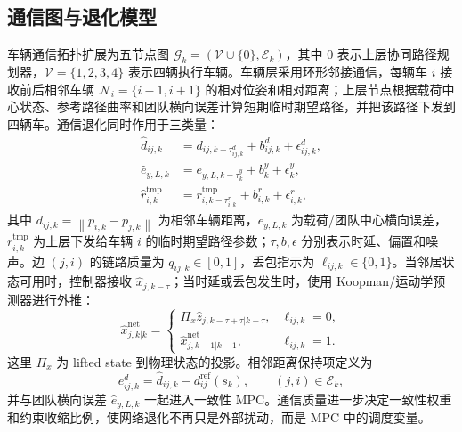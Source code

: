 \documentclass[twocolumn,3p,times,procedia]{elsarticle}
\newif\ifNRReview
\newcommand{\reviewblock}[1]{\ifNRReview\par\smallskip\noindent\begingroup\setlength{\fboxsep}{4pt}\colorbox{yellow!35}{\parbox{0.96\linewidth}{\footnotesize\textbf{当前不足：} #1}}\endgroup\par\smallskip\fi}
\newcommand{\norm}[1]{\left\lVert #1 \right\rVert}
\begin{document}
\subsection{通信图与退化模型}

车辆通信拓扑扩展为五节点图 $\mathcal G_k=(\mathcal V\cup\{0\},\mathcal E_k)$，其中 $0$ 表示上层协同路径规划器，$\mathcal V=\{1,2,3,4\}$ 表示四辆执行车辆。车辆层采用环形邻接通信，每辆车 $i$ 接收前后相邻车辆 $\mathcal N_i=\{i-1,i+1\}$ 的相对位姿和相对距离；上层节点根据载荷中心状态、参考路径曲率和团队横向误差计算短期临时期望路径，并把该路径下发到四辆车。通信退化同时作用于三类量：
\begin{equation}
\begin{aligned}
\hat d_{ij,k}&=d_{ij,k-\tau^d_{ij,k}}+b^d_{ij,k}+\epsilon^d_{ij,k},\\
\hat e_{y,L,k}&=e_{y,L,k-\tau^y_k}+b^y_k+\epsilon^y_k,\\
\hat r_{i,k}^{\mathrm{tmp}}&=r_{i,k-\tau^r_{i,k}}^{\mathrm{tmp}}+b^r_{i,k}+\epsilon^r_{i,k},
\end{aligned}
\label{eq:comm_corrupted_measurements}
\end{equation}
其中 $d_{ij,k}=\norm{p_{i,k}-p_{j,k}}$ 为相邻车辆距离，$e_{y,L,k}$ 为载荷/团队中心横向误差，$r_{i,k}^{\mathrm{tmp}}$ 为上层下发给车辆 $i$ 的临时期望路径参数；$\tau,b,\epsilon$ 分别表示时延、偏置和噪声。边 $(j,i)$ 的链路质量为 $q_{ij,k}\in[0,1]$，丢包指示为 $\ell_{ij,k}\in\{0,1\}$。当邻居状态可用时，控制器接收 $\hat x_{j,k-\tau}$；当时延或丢包发生时，使用 Koopman/运动学预测器进行外推：
\begin{equation}
\hat x_{j,k|k}^{\mathrm{net}}=
\begin{cases}
\Pi_x \hat z_{j,k-\tau+\tau|k-\tau}, & \ell_{ij,k}=0,\\
\hat x_{j,k-1|k-1}^{\mathrm{net}}, & \ell_{ij,k}=1 .
\end{cases}
\label{eq:delay_prediction}
\end{equation}
这里 $\Pi_x$ 为 lifted state 到物理状态的投影。相邻距离保持项定义为
\begin{equation}
e^{d}_{ij,k}=\hat d_{ij,k}-d^{\mathrm{ref}}_{ij}(s_k),\qquad (j,i)\in\mathcal E_k ,
\label{eq:adjacent_distance_error}
\end{equation}
并与团队横向误差 $\hat e_{y,L,k}$ 一起进入一致性 MPC。通信质量进一步决定一致性权重和约束收缩比例，使网络退化不再只是外部扰动，而是 MPC 中的调度变量。
\reviewblock{实验3已启用相邻距离保持诊断、团队横向误差通信退化、上层--下层路径链路以及四轮转向局部路径预瞄；最新同初始条件面板可把 5 m/s 回头弯写作“高曲率抗扰分支显著降低横向 RMSE 和峰值、货物保护分支降低合力并保持误差可接受”，把 15 m/s 正弦写作速度裁剪修正后完整路段闭合，并在 single-seed 下同时降低横向与纵向 RMSE。2/10/15 m/s 和回头弯最终保护分支仍有局部正 gap，因此不能写成全速度全过程逐点严格优于基线。}
\end{document}
